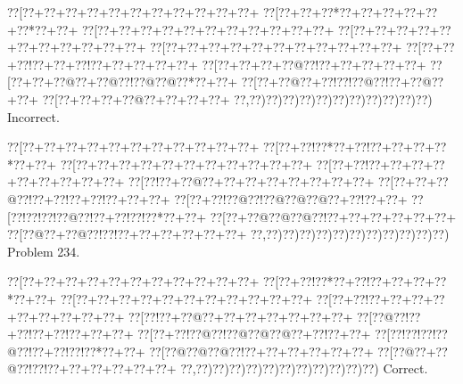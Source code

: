 \documentclass[a5paper]{article}
\begin{document}
\begin{center}
{\goo
\0??[\0??+\0??+\0??+\0??+\0??+\0??+\0??+\0??+\0??+\0??+\0??+
\0??[\0??+\0??+\0??*\0??+\0??+\0??+\0??+\0??+\0??*\0??+\0??+
\0??[\0??+\0??+\0??+\0??+\0??+\0??+\0??+\0??+\0??+\0??+\0??+
\0??[\0??+\0??+\0??+\0??+\0??+\0??+\0??+\0??+\0??+\0??+\0??+
\0??[\0??+\0??+\0??+\0??+\0??+\0??+\0??+\0??+\0??+\0??+\0??+
\0??[\0??+\0??+\0??!\0??+\0??+\0??!\0??+\0??+\0??+\0??+\0??+
\0??[\0??+\0??+\0??+\0??@\0??!\0??+\0??+\0??+\0??+\0??+
\0??[\0??+\0??+\0??@\0??+\0??@\0??!\0??@\0??@\0??*\0??+\0??+
\0??[\0??+\0??@\0??+\0??!\0??!\0??@\0??!\0??+\0??@\0??+\0??+
\0??[\0??+\0??+\0??+\0??@\0??+\0??+\0??+\0??+
\0??,\0??)\0??)\0??)\0??)\0??)\0??)\0??)\0??)\0??)\0??)\0??)
}
Incorrect. 

\end{center}
\newpage
\begin{center}
{\goo
\0??[\0??+\0??+\0??+\0??+\0??+\0??+\0??+\0??+\0??+\0??+\0??+
\0??[\0??+\0??!\0??*\0??+\0??!\0??+\0??+\0??+\0??*\0??+\0??+
\0??[\0??+\0??+\0??+\0??+\0??+\0??+\0??+\0??+\0??+\0??+\0??+
\0??[\0??+\0??!\0??+\0??+\0??+\0??+\0??+\0??+\0??+\0??+\0??+
\0??[\0??!\0??+\0??@\0??+\0??+\0??+\0??+\0??+\0??+\0??+\0??+
\0??[\0??+\0??+\0??@\0??!\0??+\0??!\0??+\0??!\0??+\0??+\0??+
\0??[\0??+\0??!\0??@\0??!\0??@\0??@\0??@\0??+\0??!\0??+\0??+
\0??[\0??!\0??!\0??!\0??@\0??!\0??+\0??!\0??!\0??*\0??+\0??+
\0??[\0??+\0??@\0??@\0??@\0??!\0??+\0??+\0??+\0??+\0??+\0??+
\0??[\0??@\0??+\0??@\0??!\0??!\0??+\0??+\0??+\0??+\0??+\0??+
\0??,\0??)\0??)\0??)\0??)\0??)\0??)\0??)\0??)\0??)\0??)\0??)
}
Problem 234.

\end{center}
\begin{center}
{\goo
\0??[\0??+\0??+\0??+\0??+\0??+\0??+\0??+\0??+\0??+\0??+\0??+
\0??[\0??+\0??!\0??*\0??+\0??!\0??+\0??+\0??+\0??*\0??+\0??+
\0??[\0??+\0??+\0??+\0??+\0??+\0??+\0??+\0??+\0??+\0??+\0??+
\0??[\0??+\0??!\0??+\0??+\0??+\0??+\0??+\0??+\0??+\0??+\0??+
\0??[\0??!\0??+\0??@\0??+\0??+\0??+\0??+\0??+\0??+\0??+
\0??[\0??@\0??!\0??+\0??!\0??+\0??!\0??+\0??+\0??+
\0??[\0??+\0??!\0??@\0??!\0??@\0??@\0??@\0??+\0??!\0??+\0??+
\0??[\0??!\0??!\0??!\0??@\0??!\0??+\0??!\0??!\0??*\0??+\0??+
\0??[\0??@\0??@\0??@\0??!\0??+\0??+\0??+\0??+\0??+\0??+
\0??[\0??@\0??+\0??@\0??!\0??!\0??+\0??+\0??+\0??+\0??+\0??+
\0??,\0??)\0??)\0??)\0??)\0??)\0??)\0??)\0??)\0??)\0??)\0??)
}
Correct. 

\end{center}
\end{document}
